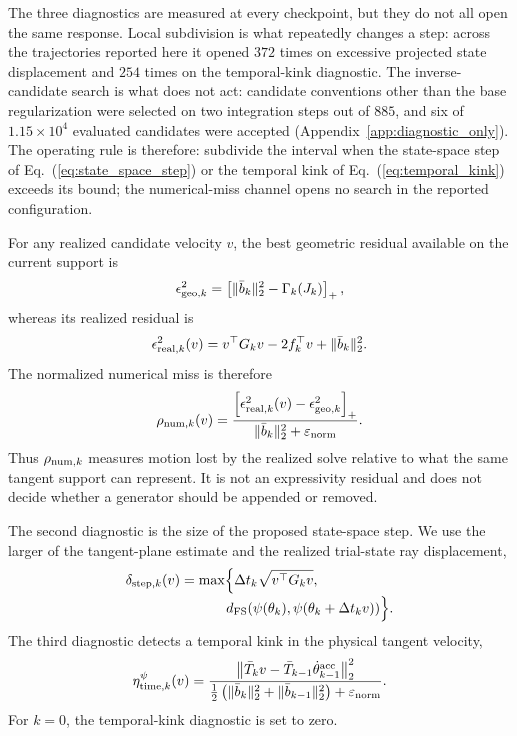 \documentclass[
  reprint,
  amsmath,
  amssymb,
  aps,
  pra,
  nofootinbib,
  superscriptaddress,
  floatfix
]{revtex4-2}
\newcommand{\eps}{\varepsilon}
\begin{document}
The three diagnostics are measured at every checkpoint, but they do not all open the same response.  Local subdivision is what repeatedly changes a step: across the trajectories reported here it opened $372$ times on excessive projected state displacement and $254$ times on the temporal-kink diagnostic.  The inverse-candidate search is what does not act: candidate conventions other than the base regularization were selected on two integration steps out of $885$, and six of $1.15\times10^{4}$ evaluated candidates were accepted (Appendix~\ref{app:diagnostic_only}).  The operating rule is therefore: subdivide the interval when the state-space step of Eq.~(\ref{eq:state_space_step}) or the temporal kink of Eq.~(\ref{eq:temporal_kink}) exceeds its bound; the numerical-miss channel opens no search in the reported configuration.

For any realized candidate velocity \(v\), the best geometric residual available on the current support is
\begin{equation}
\epsilon_{{\rm geo},k}^{2}
=
\left[
\|\bar b_k\|_2^2-\Gamma_k(J_k)
\right]_+,
\label{eq:geometric_residual}
\end{equation}
whereas its realized residual is
\begin{equation}
\epsilon_{{\rm real},k}^{2}(v)
=v^\top G_kv-2f_k^\top v+\|\bar b_k\|_2^2.
\label{eq:realized_residual}
\end{equation}
The normalized numerical miss is therefore
\begin{equation}
\rho_{{\rm num},k}(v)
=
\frac{
\left[\epsilon_{{\rm real},k}^{2}(v)
-\epsilon_{{\rm geo},k}^{2}\right]_+
}{
\|\bar b_k\|_2^2+\eps_{\rm norm}
}.
\label{eq:numerical_miss}
\end{equation}
Thus \(\rho_{{\rm num},k}\) measures motion lost by the realized solve relative to what the same tangent support can represent.  It is not an expressivity residual and does not decide whether a generator should be appended or removed.

The second diagnostic is the size of the proposed state-space step.  We use the larger of the tangent-plane estimate and the realized trial-state ray displacement,
\begin{equation}
\begin{aligned}
\delta_{{\rm step},k}(v)
&=\max\Bigl\{
\Delta t_k\sqrt{v^\top G_kv},
\\[-2pt]
&\hspace{3.3em}
d_{\rm FS}\!\left(
\psi(\theta_k),
\psi(\theta_k+\Delta t_kv)
\right)
\Bigr\}.
\end{aligned}
\label{eq:state_space_step}
\end{equation}
The third diagnostic detects a temporal kink in the physical tangent velocity,
\begin{equation}
\eta_{{\rm time},k}^{\psi}(v)
=
\frac{
\left\|
\bar T_kv-
\bar T_{k-1}\dot\theta_{k-1}^{\rm acc}
\right\|_2^2
}{
\tfrac12\left(
\|\bar b_k\|_2^2+
\|\bar b_{k-1}\|_2^2
\right)+\eps_{\rm norm}
}.
\label{eq:temporal_kink}
\end{equation}
For \(k=0\), the temporal-kink diagnostic is set to zero.
\end{document}
